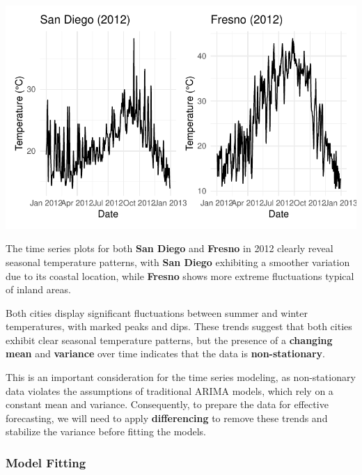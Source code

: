 \documentclass[
  11pt,
]{article}
\begin{document}
\includegraphics{project_files/figure-pdf/unnamed-chunk-84-1.pdf}

The time series plots for both \textbf{San Diego} and \textbf{Fresno} in
2012 clearly reveal seasonal temperature patterns, with \textbf{San
Diego} exhibiting a smoother variation due to its coastal location,
while \textbf{Fresno} shows more extreme fluctuations typical of inland
areas.

Both cities display significant fluctuations between summer and winter
temperatures, with marked peaks and dips. These trends suggest that both
cities exhibit clear seasonal temperature patterns, but the presence of
a \textbf{changing mean} and \textbf{variance} over time indicates that
the data is \textbf{non-stationary}.

This is an important consideration for the time series modeling, as
non-stationary data violates the assumptions of traditional ARIMA
models, which rely on a constant mean and variance. Consequently, to
prepare the data for effective forecasting, we will need to apply
\textbf{differencing} to remove these trends and stabilize the variance
before fitting the models.

\subsubsection{Model Fitting}\label{model-fitting}
\end{document}
